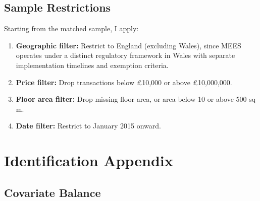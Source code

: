 \documentclass[12pt]{article}
\begin{document}
\subsection{Sample Restrictions}

Starting from the matched sample, I apply:
\begin{enumerate}
\item \textbf{Geographic filter:} Restrict to England (excluding Wales), since MEES operates under a distinct regulatory framework in Wales with separate implementation timelines and exemption criteria.
\item \textbf{Price filter:} Drop transactions below \pounds 10,000 or above \pounds 10,000,000.
\item \textbf{Floor area filter:} Drop missing floor area, or area below 10 or above 500 sq m.
\item \textbf{Date filter:} Restrict to January 2015 onward.
\end{enumerate}


\section{Identification Appendix}\label{app:identification}

\subsection{Covariate Balance}
\end{document}
